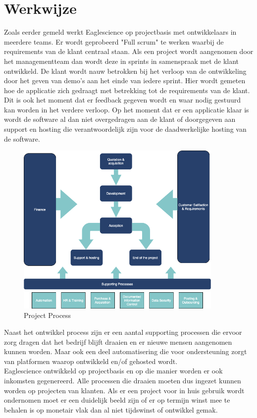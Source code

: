 \section{Werkwijze}\label{sec:werkwijze}
Zoals eerder gemeld werkt Eaglescience op projectbasis met ontwikkelaars in meerdere teams.
Er wordt geprobeerd "Full scrum" te werken waarbij de requirements van de klant centraal staan.
Als een project wordt aangenomen door het managementteam dan wordt deze in sprints in samenspraak met de klant ontwikkeld.
De klant wordt nauw betrokken bij het verloop van de ontwikkeling door het geven van demo's aan het einde van iedere sprint.
Hier wordt gemeten hoe de applicatie zich gedraagt met betrekking tot de requirements van de klant.
Dit is ook het moment dat er feedback gegeven wordt en waar nodig gestuurd kan worden in het verdere verloop.
Op het moment dat er een applicatie klaar is wordt de software al dan niet overgedragen aan de klant of doorgegeven aan support en hosting die verantwoordelijk zijn voor de daadwerkelijke hosting van de software.
\begin{figure}[bth]
\myfloatalign
\includegraphics[width=10cm]{gfx/ProcessFlow}
\caption{Project Process}
\label{fig:Project Process}
\end{figure}

Naast het ontwikkel process zijn er een aantal supporting processen die ervoor zorg dragen dat het bedrijf blijft draaien en er nieuwe mensen aangenomen kunnen worden.
Maar ook een deel automatisering die voor ondersteuning zorgt van platformen waarop ontwikkeld en/of gehosted wordt.\\
Eaglescience ontwikkeld op projectbasis en op die manier worden er ook inkomsten gegenereerd.
Alle processen die draaien moeten dus ingezet kunnen worden op projecten van klanten.
Als er een project voor in huis gebruik wordt ondernomen moet er een duidelijk beeld zijn of er op termijn winst mee te behalen is op monetair vlak dan al niet tijdswinst of ontwikkel gemak.

